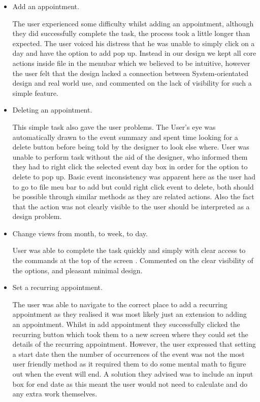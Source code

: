 \documentclass{article}
\begin{document}
\begin{itemize}
\item Add an appointment.

The user experienced some difficulty whilst adding an appointment, although
they did successfully complete the task, the process took a little longer
than expected. The user voiced his distress that he was unable to simply
click on a day and have the option to add pop up. Instead in our design 
we kept all core actions inside file in the menubar which we believed 
to be intuitive, however the user felt that the design lacked a connection 
between System-orientated design and real world use, and commented on the 
lack of visibility for such a simple feature.


\item Deleting an appointment.

This simple task also gave the user problems. The User's eye was automatically drawn 
to the event summary and spent time looking for a delete button before being told by 
the designer to look else where. User was unable to perform task without the aid
of the designer, who informed them they had to right click the selected event day 
box in order for the option to delete to pop up. Basic event inconsistency was 
apparent here as the user had to go to file meu bar to add but could right click 
event to delete, both should be possible through similar methods as they are 
related actions. Also the fact that the action was not clearly visible to the user
should be interpreted as a design problem.

\item Change views from month, to week, to day.

User was able to complete the task quickly and simply with clear access to the 
commands at the top of the screen . Commented on the clear visibility of the options, 
and pleasant minimal design.

\item Set a recurring appointment.

The user was able to navigate to the correct place to add a recurring appointment 
as they realised it was most likely just an extension to adding an 
appointment. Whilst in add appointment they successfully clicked the recurring
button which took them to a new screen where they could set the details of the
recurring appointment. However, the user expressed that setting a start date 
then the number of occurrences of the event was not the most user friendly method
as it required them to do some mental math to figure out when the event will end.
A solution they advised was to include an input box for end date as this meant 
the user would not need to calculate and do any extra work themselves.



\end{itemize}
\end{document}
